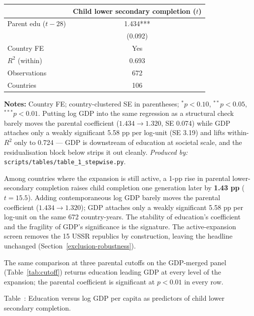 \documentclass[12pt,letterpaper]{article}
\begin{document}
{\small\setlength{\tabcolsep}{4pt}
\begin{longtable}[]{@{}lc@{}}
\toprule
 & Child lower secondary completion ($t$) \\
\midrule
\endhead
Parent edu ($t-28$)   & 1.434*** \\
                      & (0.092)  \\
\midrule
Country FE            & Yes      \\
$R^2$ (within)        & 0.693    \\
Observations          & 672      \\
Countries             & 106      \\
\bottomrule
\end{longtable}}\addtocounter{table}{-1}%

\begin{minipage}{\dimexpr\textwidth-2em}
\scriptsize
\textbf{Notes:} Country FE; country-clustered SE in parentheses;
$^{*}p<0.10$, $^{**}p<0.05$, $^{***}p<0.01$. Putting log GDP
into the same regression as a structural check barely moves the
parental coefficient ($1.434 \to 1.320$, SE 0.074) while GDP attaches
only a weakly significant 5.58 pp per log-unit (SE 3.19) and lifts
within-$R^2$ only to 0.724 --- GDP is downstream of education at
societal scale, and the residualisation block below strips it out
cleanly.
\textit{Produced by:} \texttt{scripts/tables/table\_1\_stepwise.py}.
\end{minipage}

Among countries where the expansion is still active, a 1-pp rise in
parental lower-secondary completion raises child completion one
generation later by \textbf{1.43 pp} ($t=15.5$). Adding
contemporaneous log GDP barely moves the parental coefficient
($1.434 \to 1.320$); GDP attaches only a weakly significant 5.58 pp
per log-unit on the same 672 country-years. The stability of
education's coefficient and the fragility of GDP's significance is the
signature. The active-expansion screen removes the 15 USSR republics
by construction, leaving the headline unchanged
(Section~\ref{exclusion-robustness}).

The same comparison at three parental cutoffs on the GDP-merged panel
(Table~\ref{tab:cutoff}) returns education leading GDP at every level
of the expansion; the parental coefficient is significant at $p<0.01$
in every row.

\label{tab:cutoff}Table~\thetable: Education versus log GDP per capita as predictors of child lower secondary completion.
\end{document}
